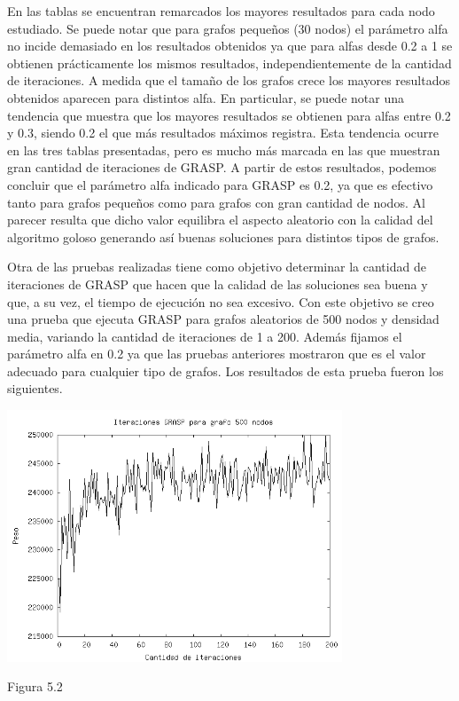 \documentclass[a4paper,11pt] {article}
\begin{document}
En las tablas se encuentran remarcados los mayores resultados para cada nodo estudiado. Se puede notar que para grafos peque\~{n}os (30 nodos) el par\'ametro alfa no incide demasiado en los resultados obtenidos ya que para alfas desde 0.2 a 1 se obtienen pr\'acticamente los mismos resultados, independientemente de la cantidad de iteraciones. A medida que el tama\~{n}o de los grafos crece los mayores resultados obtenidos aparecen para distintos alfa. En particular, se puede notar una tendencia que muestra que los mayores resultados se obtienen para alfas entre 0.2 y 0.3, siendo 0.2 el que m\'as resultados m\'aximos registra. Esta tendencia ocurre en las tres tablas presentadas, pero es mucho m\'as marcada en las que muestran gran cantidad de iteraciones de GRASP. A partir de estos resultados, podemos concluir que el par\'ametro alfa indicado para GRASP es 0.2, ya que es efectivo tanto para grafos peque\~{n}os como para grafos con gran cantidad de nodos. Al parecer resulta que dicho valor equilibra el aspecto aleatorio con la calidad del algoritmo goloso generando as\'i buenas soluciones para distintos tipos de grafos.

Otra de las pruebas realizadas tiene como objetivo determinar la cantidad de iteraciones de GRASP que hacen que la calidad de las soluciones sea buena y que, a su vez, el tiempo de ejecuci\'on no sea excesivo. Con este objetivo se creo una prueba que ejecuta GRASP para grafos aleatorios de 500 nodos y densidad media, variando la cantidad de iteraciones de 1 a 200. Adem\'as fijamos el par\'ametro alfa en 0.2 ya que las pruebas anteriores mostraron que es el valor adecuado para cualquier tipo de grafos. Los resultados de esta prueba fueron los siguientes.

\begin{center}
 \includegraphics[width=0.75\textwidth]{graficos/pruebaCantIter.png}
\begin{center}
Figura 5.2
\end{center}
\end{center}
\end{document}
